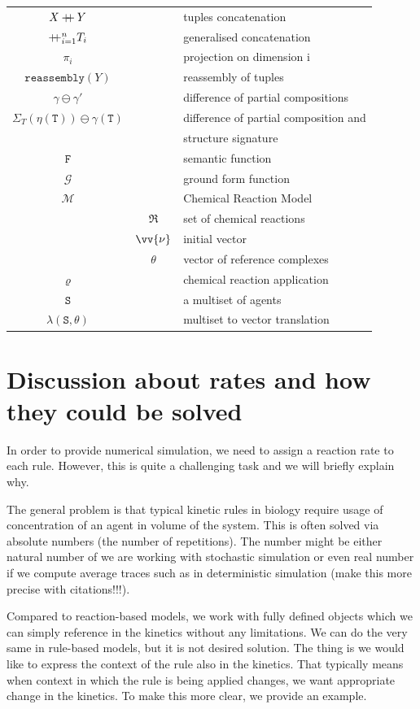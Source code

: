\documentclass[12pt]{fithesis2}
\newcommand\mdoubleplus{\mathbin{+\mkern-7mu+}}
\begin{document}
\begin{tabular}{c c | l}
$X \mdoubleplus Y$ & & tuples concatenation\\
$\mdoubleplus_{i=1}^n T_i$ & & generalised concatenation\\
$\pi_i$ & & projection on dimension i\\
$\mathtt{reassembly}(Y)$ & & reassembly of tuples\\
$\gamma \ominus \gamma'$ & & difference of partial compositions\\
$\Sigma_T(\mathtt{\eta(\mathtt{T})}) \ominus \gamma(\mathtt{T})$ & & difference of partial composition and\\
 & & structure signature\\
$\mathtt{F}$ & & semantic function\\
$\mathcal{G}$ & & ground form function\\
$\mathcal{M}$ & & Chemical Reaction Model\\
 & $\mathfrak{R}$ & set of chemical reactions\\
 & $\vv{\nu}$ & initial vector\\
 & $\theta$ & vector of reference complexes\\
$\varrho$ & & chemical reaction application\\
$\mathtt{S}$ & & a multiset of agents\\
$\lambda(\mathtt{S}, \theta)$ & & multiset to vector translation\\
\end{tabular}

\chapter{Discussion about rates and how they could be solved}
\label{rates_discussion}

In order to provide numerical simulation, we need to assign a reaction rate to each rule. However, this is quite a challenging task and we will briefly explain why.

The general problem is that typical kinetic rules in biology require usage of concentration of an agent in volume of the system. This is often solved via absolute numbers (the number of repetitions). The number might be either natural number of we are working with stochastic simulation or even real number if we compute average traces such as in deterministic simulation (make this more precise with citations!!!).

Compared to reaction-based models, we work with fully defined objects which we can simply reference in the kinetics without any limitations. We can do the very same in rule-based models, but it is not desired solution. The thing is we would like to express the context of the rule also in the kinetics. That typically means when context in which the rule is being applied changes, we want appropriate change in the kinetics. To make this more clear, we provide an example.
\end{document}
